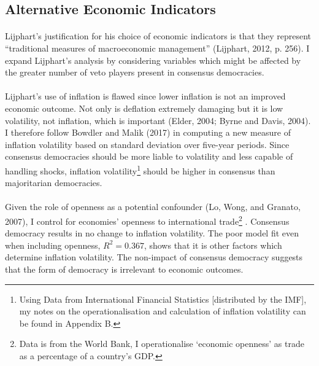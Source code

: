 \documentclass[11pt, oneside]{article}   	%
\let\oldparagraph\paragraph
\renewcommand{\paragraph}[1]{\oldparagraph{#1}\mbox{}}
\begin{document}
\subsection{Alternative Economic Indicators}

\paragraph{}
Lijphart’s justification for his choice of economic indicators is that they represent “traditional measures of macroeconomic management” (Lijphart, 2012, p. 256). I expand Lijphart’s analysis by considering variables which might be affected by the greater number of veto players present in consensus democracies.

\paragraph{}
Lijphart’s use of inflation is flawed since lower inflation is not an improved economic outcome. Not only is deflation extremely damaging but it is low volatility, not inflation, which is important (Elder, 2004; Byrne and Davis, 2004). I therefore follow Bowdler and Malik (2017) in computing a new measure of inflation volatility  based on standard deviation over five-year periods. Since consensus democracies should be more liable to volatility and less capable of handling shocks, inflation volatility\footnote{Using Data from International Financial Statistics [distributed by the IMF], my notes on the operationalisation and calculation of inflation volatility can be found in Appendix B.} should be higher in consensus than majoritarian democracies.

\paragraph{}
Given the role of openness as a potential confounder (Lo, Wong, and Granato, 2007), I control for economies’ openness to international trade\footnote{Data is from the World Bank, I operationalise ‘economic openness’ as trade as a percentage of a country’s GDP.} .  Consensus democracy results in no change to inflation volatility. The poor model fit even when including openness, \begin{math} R^2 = 0.367\end{math}, shows that it is other factors which determine inflation volatility. The non-impact of consensus democracy suggests that the form of democracy is irrelevant to economic outcomes.
\end{document}
